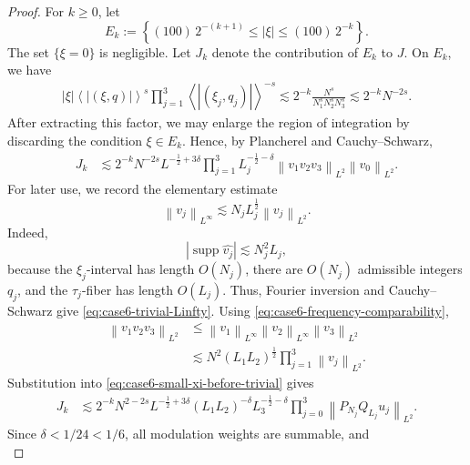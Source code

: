 \documentclass[12pt,oneside,reqno]{amsart}
\numberwithin{equation}{section}
\theoremstyle{plain}
\newcommand{\abs}[1]{%
    \left|#1\right|%
}
\newcommand{\inp}[1]{%
    \left\langle #1\right\rangle
}
\newcommand{\brs}[1]{%
    \left\{#1\right\}
}
\newcommand{\Lpn}[2]{%
    \left\lVert #1\right\rVert_{L^{#2}}%
}
\newcommand{\Fh}[1]{\widehat{#1}}
\begin{document}
\begin{proof}
For $k\geq0$, let
\begin{equation}
    E_k
    :=
    \brs{
        (100)\,2^{-(k+1)}
        \leq
        \abs{\xi}
        \leq
        (100)\,2^{-k}
    }.
\end{equation}
The set $\{\xi=0\}$ is negligible. Let $J_k$ denote the contribution of $E_k$ to $J$. On $E_k$, we have
\begin{align}
\abs{\xi} \inp{\abs{(\xi,q)}}^s 
    \displaystyle\prod_{j=1}^3
    \inp{\abs{(\xi_j,q_j)}}^{-s}
\lesssim
2^{-k}
\frac{N^s}{N_1^sN_2^sN_3^s}
\lesssim
2^{-k}N^{-2s}.
\label{eq:case6-small-xi-spatial-multiplier}
\end{align}
After extracting this factor, we may enlarge the region of
integration by discarding the condition $\xi\in E_k$.
Hence, by Plancherel and Cauchy--Schwarz,
\begin{align}
J_k
&\lesssim
2^{-k}N^{-2s}
L^{-\frac12+3\delta}
\prod_{j=1}^3L_j^{-\frac12-\delta}
\Lpn{v_1v_2v_3}{2}
\Lpn{v_0}{2}.
\label{eq:case6-small-xi-before-trivial}
\end{align}
For later use, we record the elementary estimate
\begin{equation}
\label{eq:case6-trivial-Linfty}
    \Lpn{v_j}{\infty}
    \lesssim
    N_jL_j^{\frac12}
    \Lpn{v_j}{2}.
\end{equation}
Indeed,
\begin{equation}
    \abs{
        \operatorname{supp}\Fh{v_j}
    }
    \lesssim
    N_j^2L_j,
\end{equation}
because the $\xi_j$-interval has length $O(N_j)$, there are
$O(N_j)$ admissible integers $q_j$, and the $\tau_j$-fiber has
length $O(L_j)$. Thus, Fourier inversion and Cauchy--Schwarz give
\eqref{eq:case6-trivial-Linfty}. Using \eqref{eq:case6-frequency-comparability},
\begin{align}
\Lpn{v_1v_2v_3}{2}
&\leq
\Lpn{v_1}{\infty}
\Lpn{v_2}{\infty}
\Lpn{v_3}{2}
\nonumber\\
&\lesssim
N^2
(L_1L_2)^{\frac12}
\prod_{j=1}^3
\Lpn{v_j}{2}.
\label{eq:case6-trivial-trilinear}
\end{align}
Substitution into \eqref{eq:case6-small-xi-before-trivial} gives
\begin{align}
J_k
&\lesssim
2^{-k}
N^{2-2s}
L^{-\frac12+3\delta}
(L_1L_2)^{-\delta}
L_3^{-\frac12-\delta}
\prod_{j=0}^3
\Lpn{P_{N_j}Q_{L_j}u_j}{2}.
\label{eq:case6-small-xi-dyadic}
\end{align}
Since $\delta<1/24<1/6$, all modulation weights are summable, and
\begin{equation}

\end{equation}
\end{proof}
\end{document}
